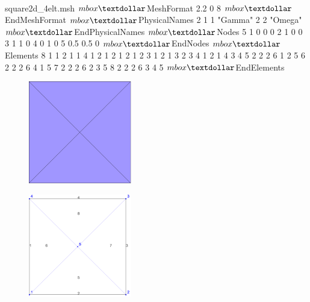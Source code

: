 \documentclass[english,10pt,a4paper]{article}
\newcommand{\dollar}{mbox{\textdollar}}
\begin{document}
\paragraph{}
\begin{minipage}[c]{0.4\linewidth}

\begin{mycpplistingInTabular}{square2d\_4elt.msh}
$\dollar$MeshFormat
2.2 0 8
$\dollar$EndMeshFormat
$\dollar$PhysicalNames
2
1 1 "Gamma"
2 2 "Omega"
$\dollar$EndPhysicalNames
$\dollar$Nodes
5
1 0 0 0
2 1 0 0
3 1 1 0
4 0 1 0
5 0.5 0.5 0
$\dollar$EndNodes
$\dollar$Elements
8
1 1 2 1 1 4 1
2 1 2 1 2 1 2
3 1 2 1 3 2 3
4 1 2 1 4 3 4
5 2 2 2 6 1 2 5
6 2 2 2 6 4 1 5
7 2 2 2 6 2 3 5
8 2 2 2 6 3 4 5
$\dollar$EndElements
\end{mycpplistingInTabular}

\end{minipage} \hfill
\begin{minipage}[c]{0.6\linewidth}
\begin{figure}[H]
  \centering
  \includegraphics[width=0.4\textwidth]{docs/modules/ROOT/images/square2d_4elt.png}
\end{figure}
\begin{figure}[H]
  \centering
  \vspace*{-0.05\textwidth}
  \includegraphics[width=0.4\textwidth]{docs/modules/ROOT/images/square2d_4elt_numbering.png}
\end{figure}
\end{minipage}
\end{document}
